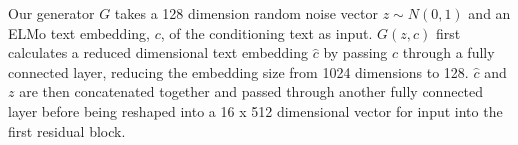 Our generator $G$ takes a 128 dimension random noise vector $z \sim N(0, 1)$ and an ELMo text embedding, $c$, of the conditioning text as input. $G(z, c)$ first calculates a reduced dimensional text embedding $\hat{c}$ by passing $c$ through a fully connected layer, reducing the embedding size from 1024 dimensions to 128. $\hat{c}$ and $z$ are then concatenated together and passed through another fully connected layer before being reshaped into a 16 x 512 dimensional vector for input into the first residual block. 